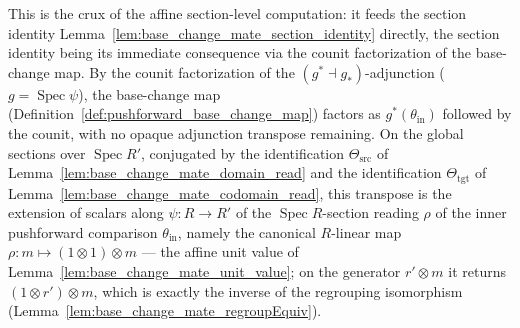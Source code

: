 \begin{lemma}
  This is the crux of the affine section-level computation: it feeds the
  section identity Lemma~\ref{lem:base_change_mate_section_identity} directly, the section
  identity being its immediate consequence via the counit factorization of the base-change map.
  By the counit factorization of the \((g^* \dashv g_*)\)-adjunction
  (\(g = \operatorname{Spec}\psi\)), the base-change map
  (Definition~\ref{def:pushforward_base_change_map}) factors as \(g^*(\theta_{\mathrm{in}})\)
  followed by the counit, with no opaque adjunction transpose remaining. On the global sections
  over \(\operatorname{Spec} R'\), conjugated by the identification \(\Theta_{\mathrm{src}}\)
  of Lemma~\ref{lem:base_change_mate_domain_read} and the identification \(\Theta_{\mathrm{tgt}}\)
  of Lemma~\ref{lem:base_change_mate_codomain_read}, this transpose is the extension of scalars
  along \(\psi : R \to R'\) of the \(\operatorname{Spec} R\)-section reading \(\rho\) of the inner
  pushforward comparison \(\theta_{\mathrm{in}}\), namely the canonical \(R\)-linear map
  \(\rho : m \mapsto (1 \otimes 1) \otimes m\) — the affine unit value of
  Lemma~\ref{lem:base_change_mate_unit_value}; on the generator \(r' \otimes m\) it returns
  \((1 \otimes r') \otimes m\), which is exactly the inverse of the regrouping isomorphism
  (Lemma~\ref{lem:base_change_mate_regroupEquiv}).
\end{lemma}
